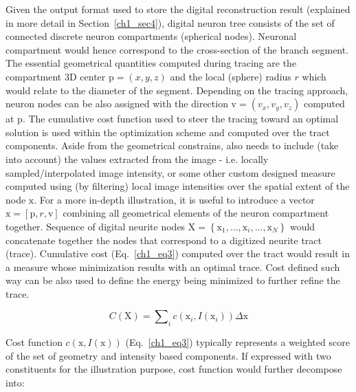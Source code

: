 Given the output format used to store the digital reconstruction result (explained in more detail in Section~\ref{ch1_sec4}), digital neuron tree consists of the set of connected discrete neuron compartments (spherical nodes). Neuronal compartment would hence correspond to the cross-section of the branch segment. The essential geometrical quantities computed during tracing are the compartment 3D center $\mathrm{p} = (x, y, z)$ and the local (sphere) radius $r$ which would relate to the diameter of the segment. Depending on the tracing approach, neuron nodes can be also assigned with the direction $ \mathrm{v} = ( v_x, v_y, v_z ) $ computed at $\mathrm{p}$. The cumulative cost function used to steer the tracing toward an optimal solution is used within the optimization scheme and computed over the tract components. Aside from the geometrical constrains, also needs to include (take into account) the values extracted from the image - i.e. locally sampled/interpolated image intensity, or some other custom designed measure computed using (by filtering) local image intensities over the spatial extent of the node $\mathrm{x}$. For a more in-depth illustration, it is useful to introduce a vector $\mathrm{x} = \left[  \mathrm{p}, r, \mathrm{v} \right] $ combining all geometrical elements of the neuron compartment together. Sequence of digital neurite nodes $\mathrm{X} = \left\lbrace \mathrm{x}_1, ... , \mathrm{x}_i, ..., \mathrm{x}_N \right\rbrace$ would concatenate together the nodes that correspond to a digitized neurite tract (trace). Cumulative cost (Eq.~\ref{ch1_eq3}) computed over the tract would result in a measure whose minimization results with an optimal trace. Cost defined such way can be also used to define the energy being minimized to further refine the trace.


\begin{equation}
C(\mathrm{X}) = \sum\nolimits_{i} c(\mathrm{x}_i, I(\mathrm{x}_i)) \Delta\mathrm{x} 
\label{ch1_eq3}
\end{equation}

Cost function $ c( \mathrm{x}, I(\mathrm{x}) ) $ (Eq.~\ref{ch1_eq3}) typically represents a weighted score of the set of geometry and intensity based components. If expressed with two constituents for the illustration purpose, cost function would further decompose into:


